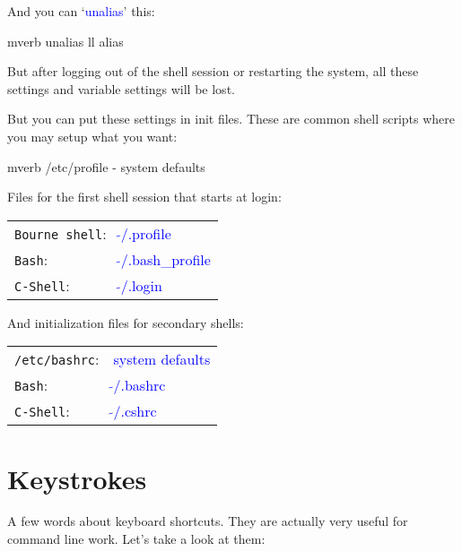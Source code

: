 \documentclass[12pt]{report}
\newcommand{\struct}[1]{\textcolor{blue}{#1}}
\begin{document}
\medskip
And you can `\struct{unalias}' this:
\begin{code}{mverb}
unalias ll
alias
\end{code}

\medskip
But after logging out of the shell session or restarting the system,
all these settings and variable settings will be lost.

\medskip
But you can put these settings in init files. These are common shell
scripts where you may setup what you want:
\begin{code}{mverb}
/etc/profile - system defaults
\end{code}

\medskip
Files for the first shell session that starts at login:\\
\begin{tabular}{ll}
{\tt Bourne shell}:&\struct{$\tilde{\mbox{}}$/.profile}\\ %
{\tt Bash}:        &\struct{$\tilde{\mbox{}}$/.bash\_profile}\\ %
{\tt C-Shell}:     &\struct{$\tilde{\mbox{}}$/.login} %
\end{tabular}

\medskip
And initialization files for secondary shells:
\begin{tabular}{ll}
{\tt /etc/bashrc}: &\struct{system defaults}\\
{\tt Bash}:        &\struct{$\tilde{\mbox{}}$/.bashrc}\\ %
{\tt C-Shell}:     &\struct{$\tilde{\mbox{}}$/.cshrc} %
\end{tabular}

\section*{Keystrokes}

A few words about keyboard shortcuts. They are actually very useful
for command line work. Let's take a look at them:
\end{document}
